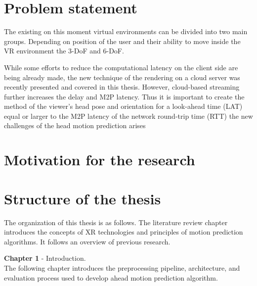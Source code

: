 \section{Problem statement}
\label{sec:intro:problem}
The existing on this moment virtual environments can be divided into two main groups. Depending on position of the user and their ability to move inside the VR environment the 3-DoF and 6-DoF. 

While some efforts to reduce the computational latency on the client side are being already made, the new technique of the rendering on a cloud server was recently presented and covered in this thesis. However, cloud-based streaming further increases the delay and M2P latency. Thus it is important to create the method of the viewer's head pose and orientation for a look-ahead time (LAT) equal or larger to the M2P latency of the network round-trip time (RTT) the new challenges of the head motion prediction arises 

\section{Motivation for the research}
\label{sec:intro:motivation}



\section{Structure of the thesis}
\label{sec:intro:structure}
The organization of this thesis is as follows. The literature review chapter introduces the concepts of XR technologies and principles of motion prediction algorithms. It follows an overview of previous research. 

\textbf{Chapter 1} - Introduction.\\
The following chapter introduces the preprocessing pipeline, architecture, and evaluation process used to develop ahead motion prediction algorithm.




